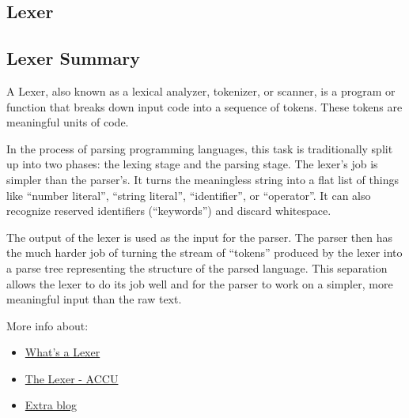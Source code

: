 \begin{center}
    \centering
    \section{Lexer}
\end{center}

\subsection{Lexer Summary}

A Lexer, also known as a lexical analyzer, tokenizer, or scanner, is a program or function that breaks down input code into a sequence of tokens. These tokens are meaningful units of code. 

In the process of parsing programming languages, this task is traditionally split up into two phases: the lexing stage and the parsing stage. The lexer's job is simpler than the parser's. It turns the meaningless string into a flat list of things like ``number literal'', ``string literal'', ``identifier'', or ``operator''. It can also recognize reserved identifiers (``keywords'') and discard whitespace. 

The output of the lexer is used as the input for the parser. The parser then has the much harder job of turning the stream of ``tokens'' produced by the lexer into a parse tree representing the structure of the parsed language. This separation allows the lexer to do its job well and for the parser to work on a simpler, more meaningful input than the raw text.

More info about:
\begin{itemize}
    \item \href{https://dev.to/cad97/what-is-a-lexer-anyway-4kdo}{What's a Lexer}
    \item \href{https://accu.org/journals/overload/26/145/balaam_2510/}{The Lexer - ACCU}
    \item \href{https://www.programmingassignmenthelper.com/blog/lexer-and-parser-in-c/}{Extra blog}
\end{itemize}

\lstset{style=sharpc}
